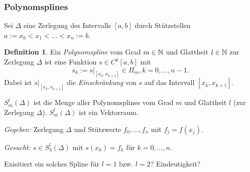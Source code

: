 \documentclass[
 a4paper,
 12pt,
 parskip=half
 ]{scrartcl}
\numberwithin{equation}{section}
\theoremstyle{plain}
\theoremstyle{definition}
\newtheorem{defn}{Definition}[section] %
\numberwithin{equation}{section}
\begin{document}
\subsubsection{Polynomsplines}
Sei $\Delta$ eine Zerlegung des Intervalls $[a,b]$ durch Stützstellen $a := x_0 < x_1 < \ldots < x_n := b$.

\begin{defn}
 Ein \emph{Polynomspline} vom Grad $m \in \mathbb{N}$ und Glattheit $l \in \mathbb{N}$ zur Zerlegung $\Delta$ ist eine Funktion $s \in C^k[a,b]$ mit
 \[ s_k := s |_{[x_k,x_{k+1}]} \in \Pi_m, k = 0, \ldots, n-1. \]
 Dabei ist $s |_{[x_k,x_{k+1}]}$ die \emph{Einschränkung} von $s$ auf das Intervall $[x_k,x_{k+1}]$.
 
 $S_m^l(\Delta)$ ist die Menge aller Polynomsplines vom Grad $m$ und Glattheit $l$ (zur Zerlegung $\Delta$). $S_m^l(\Delta)$ ist ein Vektorraum.
\end{defn}

\emph{Gegeben:} Zerlegung $\Delta$ und Stützwerte $f_0, \ldots, f_n$ mit $f_j = f(x_j)$.

\emph{Gesucht:} $s \in S_3^l(\Delta)$ mit $s(x_k) = f_k$ für $k = 0, \ldots, n$.

Exisitiert ein solches Spline für $l=1$ bzw. $l=2$? Eindeutigkeit?
\end{document}

